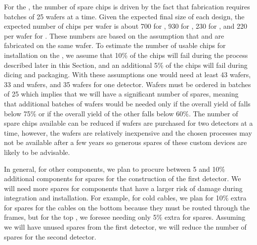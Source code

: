 For the , the number of spare chips is driven by the fact that fabrication
requires batches of 25 wafers at a time. Given the expected final size of each design, the
expected number of chips per wafer is about 700 for , 930 for ,
230 for , and 220 per wafer for . These numbers are based on the
assumption that  and  are fabricated on the same wafer. To
estimate the number of usable chips for installation on the , we assume that
10\% of the chips will fail during the  process described later in this Section,
and an additional 5\% of the chips will fail during dicing and packaging. With these
assumptions one would need at least 43  wafers, 33  and 
 wafers, and 35  wafers for one  detector. Wafers
must be ordered in batches of 25 which implies that we will have a significant number of
spares, meaning that additional batches of wafers would be needed only if the overall
yield of  falls below 75\% or if the overall yield of the other
 falls below 60\%. The number of spare chips available can be reduced if wafers are purchased for two
 detectors at a time, however, the wafers are relatively inexpensive and the chosen
processes may not be available after a few years so generous spares of these custom devices
are likely to be advisable. 

In general, for other components, we plan to procure between 5 and
10\% additional components for spares for the construction of the first 
detector. We will need more spares for components that have
a larger risk of damage during integration and 
installation. For example, for cold cables, we
plan for 10\% extra for spares for the cables on the bottom  because
they must be routed through the  frames, but
for the top , we foresee needing only 5\% extra for spares.
Assuming we will have unused spares from the first detector, we will reduce the number of
spares for the second  detector.

